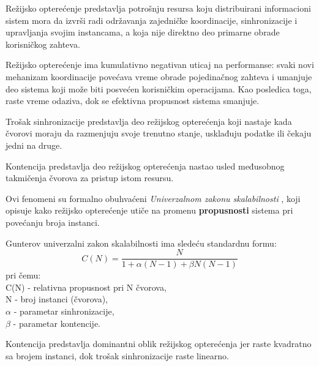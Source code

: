 \begin{definicija}\label{def:overhead}
Režijsko opterećenje  predstavlja potrošnju resursa koju distribuirani informacioni sistem mora da izvrši radi održavanja zajedničke koordinacije, sinhronizacije i upravljanja svojim instancama, a koja nije direktno deo primarne obrade korisničkog zahteva.
\end{definicija}

Režijsko opterećenje ima kumulativno negativan uticaj na performanse: svaki novi mehanizam koordinacije povećava vreme obrade pojedinačnog zahteva i umanjuje deo sistema koji može biti posvećen korisničkim operacijama. Kao posledica toga, raste vreme odaziva, dok se efektivna propusnost sistema smanjuje.

\begin{definicija}
Trošak sinhronizacije  predstavlja deo režijskog opterećenja koji nastaje kada čvorovi moraju da razmenjuju svoje trenutno stanje, usklađuju podatke ili čekaju jedni na druge.
\end{definicija}

\begin{definicija}
Kontencija  predstavlja deo režijskog opterećenja nastao usled međusobnog takmičenja čvorova za pristup istom resursu.
\end{definicija}

Ovi fenomeni su formalno obuhvaćeni \textit{Univerzalnom zakonu skalabilnosti} \cite{gunther1993simple, gunther2008general}, koji opisuje kako režijsko opterećenje utiče na promenu \textbf{propusnosti} sistema pri povećanju broja instanci.

\begin{teorema}\label{teorema:gunter}
Gunterov univerzalni zakon skalabilnosti ima sledeću standardnu formu:
$$C(N) = \frac{N}{1 + \alpha (N-1) + \beta N(N-1)} $$
pri čemu:\\
C(N) - relativna propusnost pri N čvorova,\\
N - broj instanci (čvorova),\\
$\alpha$ - parametar sinhronizacije,\\
$\beta$ - parametar kontencije.
\end{teorema}

\begin{posledica}
Kontencija predstavlja dominantni oblik režijskog opterećenja jer raste kvadratno sa brojem instanci, dok trošak sinhronizacije raste linearno.
\end{posledica}

